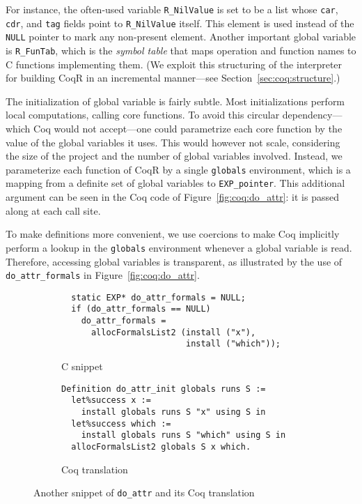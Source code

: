 \documentclass[
    sigplan,
    10pt,
    review, %
    natbib=false %
 ]{acmart}
\newcommand\CoqR{CoqR}
\begin{document}
For instance, the often-used variable \texttt{R_NilValue}
is set to be a list whose \texttt{car}, \texttt{cdr},
and \texttt{tag} fields point to \texttt{R_NilValue} itself.
This element is used instead of the \texttt{NULL} pointer
to mark any non-present element. Another important global variable is 
\texttt{R_FunTab}, which is the {\em symbol table} that maps operation and function names to C functions implementing them. (We exploit this structuring of the interpreter for building \CoqR{} in an incremental manner---see Section~\ref{sec:coq:structure}.)

%
The initialization of global variable is fairly subtle. Most initializations perform local computations, calling core functions.
To avoid this circular dependency---which Coq would not accept---one could parametrize each core function by the value of the global variables it uses.
This would however not scale, considering the size of the project and the number of global variables involved.
%
Instead, we parameterize each function of \CoqR{} by a single \texttt{globals} environment, which is a mapping from a definite set of global variables to \texttt{EXP_pointer}. This additional argument can be seen in the Coq code of Figure~\ref{fig:coq:do_attr}: it is passed along at each call site.

To make definitions more convenient, we use coercions to make Coq implicitly perform a lookup in the \texttt{globals} environment whenever a global variable is read. Therefore, accessing global variables is transparent, as illustrated by the use of \texttt{do_attr_formals} in Figure~\ref{fig:coq:do_attr}.


\begin{figure*}
    \centering{}
\begin{subfigure}{.5\textwidth}
\begin{verbatim}
  static EXP* do_attr_formals = NULL;
  if (do_attr_formals == NULL)
    do_attr_formals =
      allocFormalsList2 (install ("x"),
                         install ("which"));
\end{verbatim}
    \caption{C snippet}
    \label{fig:c:do_attr:formals}
\end{subfigure}
\begin{subfigure}{.49\textwidth}
\begin{verbatim}
Definition do_attr_init globals runs S :=
  let%success x :=
    install globals runs S "x" using S in
  let%success which :=
    install globals runs S "which" using S in
  allocFormalsList2 globals S x which.
\end{verbatim}
    \caption{Coq translation}
    \label{fig:coq:do_attr:formals}
\end{subfigure}
    \caption{Another snippet of \texttt{do_attr} and its Coq translation}
    \label{fig:do_attr:formals}
\end{figure*}
\end{document}
